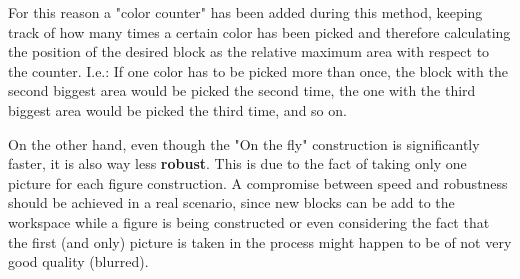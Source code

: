 For this reason a "color counter" has been added during this method, keeping track of how many times a certain color has been picked and therefore calculating the position of the desired block as the relative maximum area with respect to the counter. I.e.: If one color has to be picked more than once, the block with the second biggest area would be picked the second time, the one with the third biggest area would be picked the third time, and so on. 

On the other hand, even though the "On the fly" construction is significantly faster, it is also way less \textbf{robust}. This is due to the fact of taking only one picture for each figure construction. A compromise between speed and robustness should be achieved in a real scenario, since new blocks can be add to the workspace while a figure is being constructed or even considering the fact that the first (and only) picture is taken in the process might happen to be of not very good quality (blurred).
